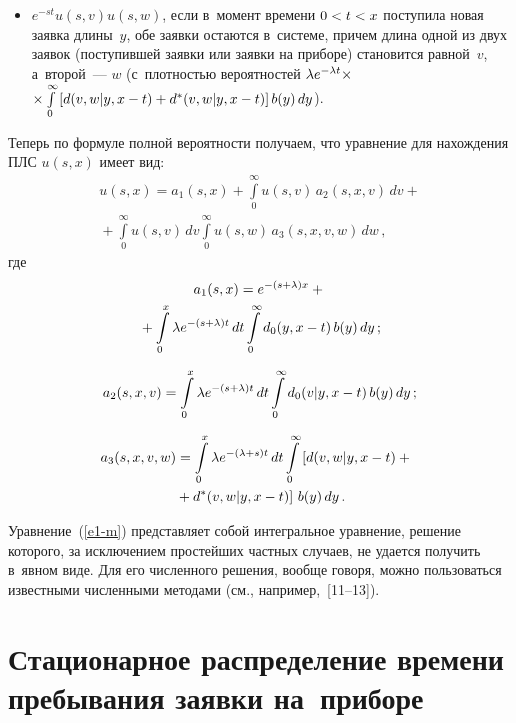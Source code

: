 \begin{multicols}{2}
\begin{itemize}
\item  $e^{-s t} u(s,v) u(s,w)$, если в~момент
времени $0\hm<t\hm<x$ поступила новая заявка длины~$y$,
обе заявки остаются в~системе, причем длина одной из двух заявок (поступившей заявки или заявки на приборе) становится равной~$v$,
а~второй~--- $w$ (с~плот\-ностью вероятностей
$\lambda e^{-\lambda t}\times$\linebreak $ \times\int\limits_0^\infty \left[d(v,w|y,x\hm-t)\hm+d^*(v,w|y,x\hm-t)\right] b(y)\, dy $).
\end{itemize}

Теперь по формуле полной вероятности получаем, что
уравнение для нахождения ПЛС $u(s,x)$ имеет вид:
\begin{multline}
u(s,x) = a_1(s,x) + \int\limits_0^\infty u(s,v)\, a_2(s,x,v)\,dv
+ {}\\
{}+\int\limits_0^\infty u(s,v)\, dv \int\limits_0^\infty u(s,w)\, a_3(s,x,v,w)\,dw
\,,
\label{e1-m}
\end{multline}
где
\begin{multline*}
a_1(s,x) = e^{-(s+\lambda)x}+ {}\\
{}+\int\limits_0^x \lambda e^{-(s+\lambda) t}\, dt
\int\limits_0^\infty d_0(y,x-t)\,b(y)\, dy\,;
\end{multline*}

\vspace*{-9pt}

\noindent
\begin{equation*}
a_2(s,x,v) = \int\limits_0^x \lambda e^{-(s+\lambda) t} \,dt
\int\limits_0^\infty d_0(v|y,x-t)\, b(y)\, dy\,;
\end{equation*}

\vspace*{-12pt}

\noindent
\begin{multline*}
\hspace*{-3.0176pt}a_3(s,x,v,w) = \int\limits_0^x \lambda e^{-(\lambda+s) t}\, dt
\int\limits_0^\infty \left[\vphantom{d^*}
d(v,w|y,x-t)+{}\right.\\
\left.{}+d^*(v,w|y,x-t)\right]\, b(y)\, dy\,.
\end{multline*}

Уравнение~(\ref{e1-m}) представляет собой интегральное уравнение, решение которого, за исключением простейших частных случаев, не удается получить в~явном виде. Для его численного решения,
вообще говоря, можно пользоваться известными численными методами (см., например,~[11--13]).

\section{Стационарное распределение времени пребывания заявки на~приборе}


\end{multicols}
